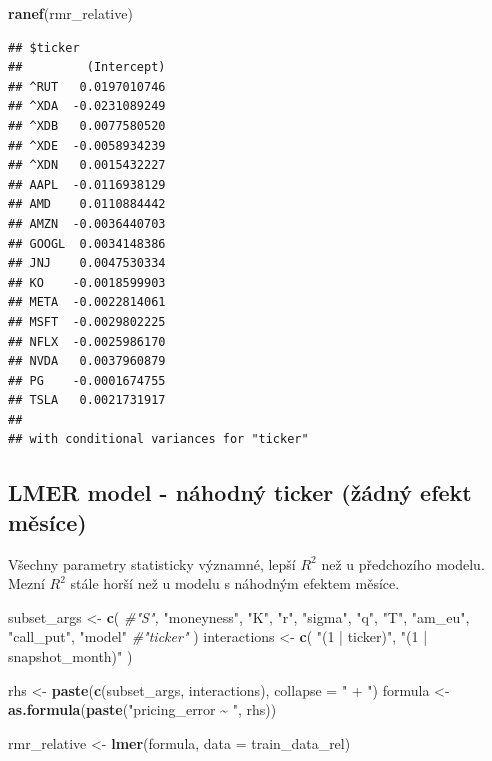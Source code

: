 \documentclass[
]{article}
\newenvironment{Shaded}{\begin{snugshade}}{\end{snugshade}}
\newcommand{\AttributeTok}[1]{\textcolor[rgb]{0.13,0.29,0.53}{#1}}
\newcommand{\CommentTok}[1]{\textcolor[rgb]{0.56,0.35,0.01}{\textit{#1}}}
\newcommand{\FunctionTok}[1]{\textcolor[rgb]{0.13,0.29,0.53}{\textbf{#1}}}
\newcommand{\NormalTok}[1]{#1}
\newcommand{\OtherTok}[1]{\textcolor[rgb]{0.56,0.35,0.01}{#1}}
\newcommand{\StringTok}[1]{\textcolor[rgb]{0.31,0.60,0.02}{#1}}
\begin{document}
\begin{Shaded}
\begin{Highlighting}[]
\FunctionTok{ranef}\NormalTok{(rmr\_relative)}
\end{Highlighting}
\end{Shaded}

\begin{verbatim}
## $ticker
##         (Intercept)
## ^RUT   0.0197010746
## ^XDA  -0.0231089249
## ^XDB   0.0077580520
## ^XDE  -0.0058934239
## ^XDN   0.0015432227
## AAPL  -0.0116938129
## AMD    0.0110884442
## AMZN  -0.0036440703
## GOOGL  0.0034148386
## JNJ    0.0047530334
## KO    -0.0018599903
## META  -0.0022814061
## MSFT  -0.0029802225
## NFLX  -0.0025986170
## NVDA   0.0037960879
## PG    -0.0001674755
## TSLA   0.0021731917
## 
## with conditional variances for "ticker"
\end{verbatim}

\subsection{LMER model - náhodný ticker (žádný efekt
měsíce)}\label{lmer-model---nuxe1hodnuxfd-ticker-ux17euxe1dnuxfd-efekt-mux11bsuxedce}

Všechny parametry statisticky významné, lepší \(R^2\) než u předchozího
modelu. Mezní \(R^2\) stále horší než u modelu s náhodným efektem
měsíce.

\begin{Shaded}
\begin{Highlighting}[]
\NormalTok{subset\_args }\OtherTok{\textless{}{-}} \FunctionTok{c}\NormalTok{(}
  \CommentTok{\#"S",}
  \StringTok{"moneyness"}\NormalTok{,}
  \StringTok{"K"}\NormalTok{,}
  \StringTok{"r"}\NormalTok{,}
  \StringTok{"sigma"}\NormalTok{,}
  \StringTok{"q"}\NormalTok{,}
  \StringTok{"T"}\NormalTok{,}
  \StringTok{"am\_eu"}\NormalTok{,}
  \StringTok{"call\_put"}\NormalTok{,}
  \StringTok{"model"}
  \CommentTok{\#"ticker"}
\NormalTok{)}
\NormalTok{interactions }\OtherTok{\textless{}{-}} \FunctionTok{c}\NormalTok{(}
  \StringTok{"(1 | ticker)"}\NormalTok{,}
  \StringTok{"(1 | snapshot\_month)"}
\NormalTok{)}

\NormalTok{rhs }\OtherTok{\textless{}{-}} \FunctionTok{paste}\NormalTok{(}\FunctionTok{c}\NormalTok{(subset\_args, interactions), }\AttributeTok{collapse =} \StringTok{" + "}\NormalTok{)}
\NormalTok{formula }\OtherTok{\textless{}{-}} \FunctionTok{as.formula}\NormalTok{(}\FunctionTok{paste}\NormalTok{(}\StringTok{"pricing\_error \textasciitilde{} "}\NormalTok{, rhs))}

\NormalTok{rmr\_relative }\OtherTok{\textless{}{-}} \FunctionTok{lmer}\NormalTok{(formula, }\AttributeTok{data =}\NormalTok{ train\_data\_rel)}
\end{Highlighting}
\end{Shaded}
\end{document}
